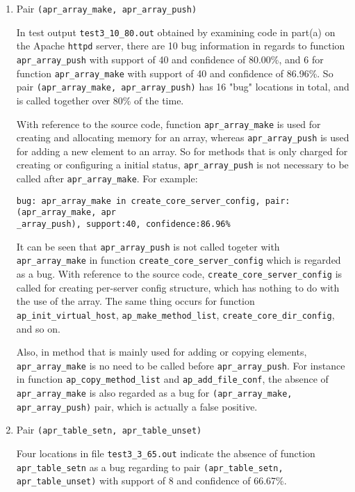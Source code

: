 \documentclass[12pt]{article}
\begin{document}
\begin{enumerate}
\item Pair \texttt{(apr\_array\_make, apr\_array\_push)} 

In test output \texttt{test3\_10\_80.out} obtained by examining code in part(a) on the Apache \texttt{httpd} server, there are 10 bug information in regards to function \texttt{apr\_array\_push} with support of 40 and confidence of 80.00\%, and 6 for function \texttt{apr\_array\_make} with support of 40 and confidence of 86.96\%. So pair \texttt{(apr\_array\_make, apr\_array\_push)} has 16 "bug" locations in total, and is called together over 80\% of the time. 

With reference to the source code, function \texttt{apr\_array\_make} is used for creating and allocating memory for an array, whereas \texttt{apr\_array\_push} is used for adding a new element to an array. So for methods that is only charged for creating or configuring a initial status, \texttt{apr\_array\_push} is not necessary to be called after \texttt{apr\_array\_make}. For example:

\begin{lstlisting}
bug: apr_array_make in create_core_server_config, pair: (apr_array_make, apr
_array_push), support:40, confidence:86.96%
\end{lstlisting}

It can be seen that \texttt{apr\_array\_push} is not called togeter with \texttt{apr\_array\_make} in function \texttt{create\_core\_server\_config} which is regarded as a bug. With reference to the source code, \texttt{create\_core\_server\_config} is called for creating per-server config structure, which has nothing to do with the use of the array. The same thing occurs for function \texttt{ap\_init\_virtual\_host}, \texttt{ap\_make\_method\_list}, \texttt{create\_core\_dir\_config}, and so on. 

Also, in method that is mainly used for adding or copying elements, \texttt{apr\_array\_make} is no need to be called before \texttt{apr\_array\_push}. For instance in function \texttt{ap\_copy\_method\_list} and \texttt{ap\_add\_file\_conf}, the absence of \texttt{apr\_array\_make} is also regarded as a bug for \texttt{(apr\_array\_make, apr\_array\_push)} pair, which is actually a false positive. 

\item Pair \texttt{(apr\_table\_setn, apr\_table\_unset)}

Four locations in file \texttt{test3\_3\_65.out} indicate the absence of function \texttt{apr\_table\_setn} as a bug regarding to pair \texttt{(apr\_table\_setn, apr\_table\_unset)} with support of 8 and confidence of 66.67\%. 


\end{enumerate}
\end{document}
